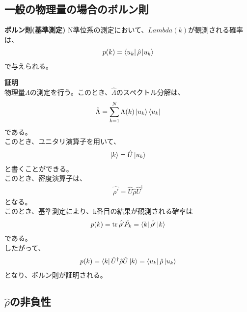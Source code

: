 \documentclass[a4paper,11pt]{jsarticle}
\begin{document}
\subsection{一般の物理量の場合のボルン則}
\begin{itembox}[l]{\textbf{ボルン則(基準測定)}}
    N準位系の測定において、$Lambda(k)$が観測される確率は、
    \begin{align}
        p(k) = \bra{u_k}\hat{\rho}\ket{u_k}
    \end{align}
    で与えられる。
\end{itembox}
\textbf{証明}\\
物理量$\Lambda$の測定を行う。このとき、$\hat{\Lambda}$のスペクトル分解は、
\begin{align}
    \hat{\Lambda} = \sum_{k=1}^{N} \Lambda(k) \ket{u_k}\bra{u_k}
\end{align}
である。\\
このとき、ユニタリ演算子を用いて、
\begin{align}
    \ket{k} = \hat{U}\ket{u_k}
\end{align}
と書くことができる。\\
このとき、密度演算子は、
\begin{align}
    \hat{\rho'} = \hat{U}\hat{\rho}\hat{U}^\dagger
\end{align}
となる。\\
このとき、基準測定により、k番目の結果が観測される確率は
\begin{align}
    p(k) = \trace{\hat{\rho'}\hat{P_k}}=\bra{k}\hat{\rho'}\ket{k}
\end{align}
である。\\
したがって、
\begin{align}
    p(k) = \bra{k}\hat{U}^\dagger\hat{\rho}\hat{U}\ket{k} = \bra{u_k}\hat{\rho}\ket{u_k}
\end{align}
となり、ボルン則が証明される。\\

\subsection{$\hat{\rho}$の非負性}
\end{document}
